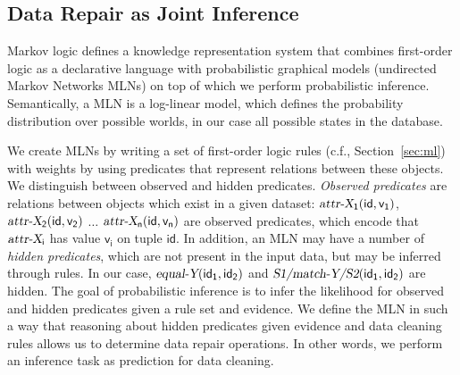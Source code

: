 \subsection{Data Repair as Joint Inference}
\label{subsec:jointinference}
Markov logic defines a knowledge representation system that combines first-order logic as a declarative language with probabilistic graphical models (undirected Markov Networks MLNs) on top of which we perform probabilistic inference. Semantically, a MLN is a log-linear model, which defines the probability distribution over possible worlds, in our case all possible states in the database.

We create MLNs by writing a set of first-order logic rules (c.f., Section~\ref{sec:ml}) with weights by using predicates that represent relations between these objects. We distinguish between observed and hidden predicates. \textit{Observed predicates} are relations between objects which exist in a given dataset: $\mathsf{\textsl{attr-X}_1(id,v_1)}$, $\mathsf{\textsl{attr-X}_2(id,v_2)}$ $\dots$ $\mathsf{\textsl{attr-X}_n(id,v_n)}$ are observed predicates, which encode that $\mathsf{\textsl{attr-X}_i}$ has value $\mathsf{v_i}$ on tuple $\mathsf{id}$. In addition, an MLN may have a number of \textit{hidden predicates}, which are not present in the input data, but may be inferred through rules. In our case, $\mathsf{\textsl{equal-Y}(id_1, id_2)}$ and $\mathsf{\textsl{S1/match-Y/S2}(id_1, id_2)}$ are hidden.  The goal of probabilistic inference is to infer the likelihood for observed and hidden predicates given a rule set and evidence. We define the MLN in such a way that reasoning about hidden predicates given evidence and data cleaning rules allows us to determine data repair operations. In other words, we perform an inference task as prediction for data cleaning.

